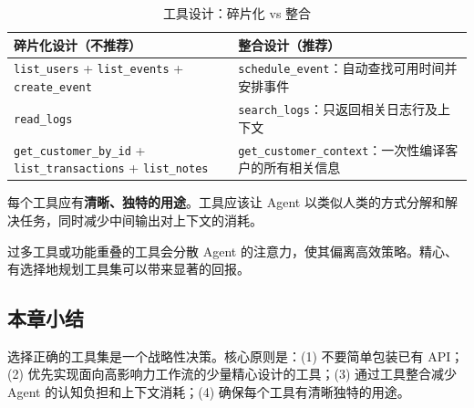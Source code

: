 \begin{table}[H]
\centering
\caption{工具设计：碎片化 vs 整合}
\begin{tabular}{p{}p{}}
\toprule
\textbf{碎片化设计（不推荐）} & \textbf{整合设计（推荐）} \\
\midrule
\texttt{list\_users} + \texttt{list\_events} + \texttt{create\_event} & \texttt{schedule\_event}：自动查找可用时间并安排事件 \\
\midrule
\texttt{read\_logs} & \texttt{search\_logs}：只返回相关日志行及上下文 \\
\midrule
\texttt{get\_customer\_by\_id} + \texttt{list\_transactions} + \texttt{list\_notes} & \texttt{get\_customer\_context}：一次性编译客户的所有相关信息 \\
\bottomrule
\end{tabular}
\end{table}

每个工具应有\textbf{清晰、独特的用途}。工具应该让 Agent 以类似人类的方式分解和解决任务，同时减少中间输出对上下文的消耗。

过多工具或功能重叠的工具会分散 Agent 的注意力，使其偏离高效策略。精心、有选择地规划工具集可以带来显著的回报。

\subsection{本章小结}

选择正确的工具集是一个战略性决策。核心原则是：(1) 不要简单包装已有 API；(2) 优先实现面向高影响力工作流的少量精心设计的工具；(3) 通过工具整合减少 Agent 的认知负担和上下文消耗；(4) 确保每个工具有清晰独特的用途。


